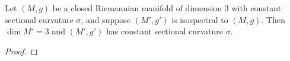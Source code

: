 \begin{proposition}\cite[prop. E.IV.18 of]{Berger.Gauduchon.Mazet-[SpectreVarieteRiemannienne]1971a}
  Let $(M,g)$ be a closed Riemannian manifold of dimension $3$ with constant sectional curvature $\sigma$, and suppose $(M',g')$ is isospectral to $(M,g)$. Then $\dim M' =3$ and $(M',g')$ has constant sectional curvature $\sigma$.
\end{proposition}
\begin{proof}

\end{proof}











\newpage








